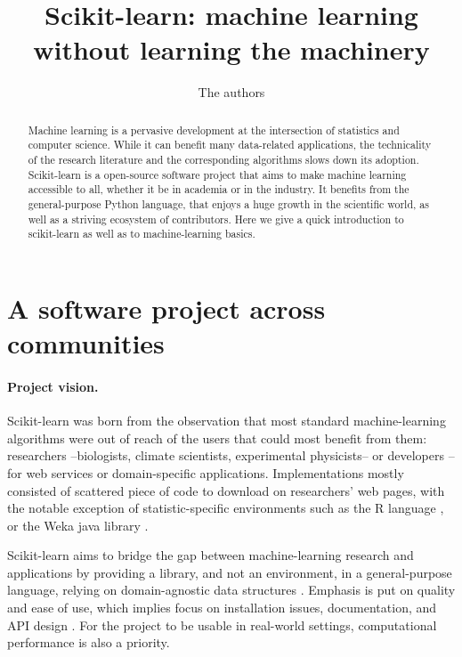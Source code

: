 \documentclass[a4paper]{article}
\title{Scikit-learn: machine learning without learning the machinery}
\author{The authors}
\begin{document}
\lstset{language=Python}

\maketitle

\begin{abstract}
Machine learning is a pervasive development at the intersection of
statistics and computer science. While it can benefit many
data-related applications, the technicality of the research literature
and the corresponding algorithms slows down its adoption. Scikit-learn is
a open-source software project that aims to make machine learning
accessible to all, whether it be in academia or in the industry. It
benefits from 
the general-purpose Python language, that enjoys a huge growth in
the scientific world, as well as a striving ecosystem of contributors.
Here we give a quick introduction to scikit-learn as well as to
machine-learning basics.
\end{abstract}

\section{A software project across communities}

\paragraph{Project vision.}
%
Scikit-learn was born from the observation that most standard
machine-learning algorithms were out of reach of the users that could
most benefit from them: researchers --biologists, climate
scientists, experimental physicists-- or developers --for web
services or domain-specific applications.
%
Implementations mostly consisted of scattered piece of code to download
on researchers' web pages, with the notable exception of
statistic-specific environments such as the R language \cite{Rmanual}, or
the Weka java library \cite{hall2009weka}.

Scikit-learn aims to bridge the gap between machine-learning research and
applications by providing a library, and not an environment, in a
general-purpose language, relying on domain-agnostic data structures
\cite{pedregosa2011}. Emphasis is put on quality and ease of use, which
implies focus on installation issues, documentation, and API design
\cite{buitinck2013ecml}. For the project to be usable in real-world
settings, computational performance is also a priority.
\end{document}
